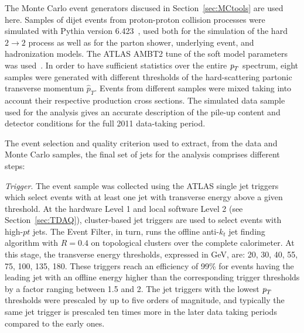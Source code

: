 The Monte Carlo event generators discused in Section~\ref{sec:MCtools} are used here. Samples of dijet events from proton-proton collision processes were simulated with {\sc Pythia} version 6.423~\cite{PYTHIA6}, used both for the simulation of the hard $2\rightarrow 2$ process as well as for the parton shower, underlying event, and hadronization models. The ATLAS AMBT2 tune of the soft model parameters was used~\cite{Pythia_MC11tune}.
In order to have sufficient statistics over the entire ${\emph{p}_{T}}$ spectrum, eight samples were generated with different thresholds of the hard-scattering partonic transverse momentum $\hat{p}_T$. Events from different samples were mixed taking into account their respective production cross sections.
The simulated data sample used for the analysis %
gives an accurate description of the pile-up content and detector conditions for the full 2011 data-taking period. 





The event selection and quality criterion used to extract, from the data and Monte Carlo samples, the final set of jets for the analysis comprises different steps: 

\vspace{5 mm}
\emph{Trigger}. The event sample was collected  using the ATLAS single jet triggers which select events with at least one jet with transverse energy above a given threshold.  At the hardware Level 1 and local software Level 2 (see Section~\ref{sec:TDAQ}), cluster-based jet triggers are used to select events with high-$pt$ jets. The Event Filter, in turn, runs  the offline anti-$k_t$ jet finding algorithm with $R = 0.4$ on topological clusters over the complete calorimeter.  At this stage, the transverse energy thresholds, expressed in GeV, are: 20, 30, 40, 55, 75, 100, 135, 180. These triggers reach an efficiency of 99\% for events having the leading jet with an offline energy higher than the corresponding trigger thresholds by a factor ranging between 1.5 and 2. The jet triggers with the lowest ${\emph{p}_{T}}$ thresholds were prescaled by up to five orders of magnitude, and typically the same jet trigger is prescaled ten times more in the later data taking periods compared to the early ones. 


